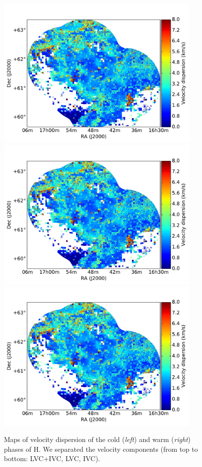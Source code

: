 \documentclass[traditabstract]{aa}
\begin{document}
\begin{figure}[h]
  \hspace{5mm}
  \includegraphics[page=5,height=7.5cm,trim=110 35 105 75,clip=true]{Figures/DHIGLS_disp.pdf} \\
  \vspace{5mm}
  \includegraphics[page=3,height=7.5cm,trim=110 35 105 75,clip=true]{Figures/DHIGLS_disp.pdf}
  \hspace{5mm}
  \includegraphics[page=6,height=7.5cm,trim=110 35 105 75,clip=true]{Figures/DHIGLS_disp.pdf}
  \caption{Maps of velocity dispersion of the cold (\emph{left}) and warm (\emph{right}) phases of H. We separated the velocity components (from top to bottom: LVC+IVC, LVC, IVC).}
\end{figure}
\end{document}
